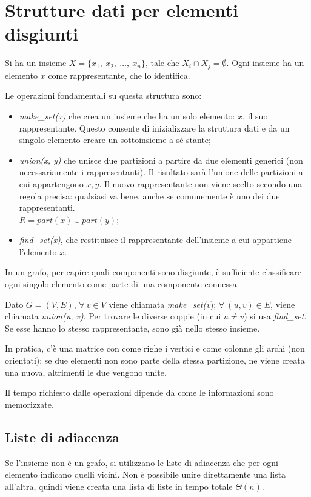 \section{Strutture dati per elementi disgiunti}
Si ha un insieme $X = \{x_1,\ x_2,\ \dots,\ x_n\}$, tale che $\bar{X}_i \cap \bar{X}_j = \emptyset$. Ogni insieme ha un elemento $x$ come rappresentante, che lo identifica.

Le operazioni fondamentali su questa struttura sono: 
\begin{itemize}
	\item \textit{make\_set(x)} che crea un insieme che ha un solo elemento: $x$, il suo rappresentante. Questo consente di inizializzare la struttura dati e da un singolo elemento creare un sottoinsieme a sé stante;
	\item \textit{union(x, y)} che unisce due partizioni a partire da due elementi generici (non necessariamente i rappresentanti). Il risultato sarà l'unione delle partizioni a cui appartengono $x, y$. Il nuovo rappresentante non viene scelto secondo una regola precisa: qualsiasi va bene, anche se comunemente è uno dei due rappresentanti. \\
	$R = part(x) \cup part(y)$;
	\item \textit{find\_set(x)}, che restituisce il rappresentante dell'insieme a cui appartiene l'elemento $x$.
\end{itemize}

In un grafo, per capire quali componenti sono disgiunte, è sufficiente classificare ogni singolo elemento come parte di una componente connessa.

Dato $G = (V, E)$, $\forall\ v \in V$ viene chiamata \textit{make\_set(v}); $\forall\ (u, v) \in E$, viene chiamata \textit{union(u, v)}. Per trovare le diverse coppie (in cui $u \neq v$) si usa \textit{find\_set}. Se esse hanno lo stesso rappresentante, sono già nello stesso insieme.

In pratica, c'è una matrice con come righe i vertici e come colonne gli archi (non orientati): se due elementi non sono parte della stessa partizione, ne viene creata una nuova, altrimenti le due vengono unite. 

Il tempo richiesto dalle operazioni dipende da come le informazioni sono memorizzate. 

\subsection{Liste di adiacenza}
Se l'insieme non è un grafo, si utilizzano le liste di adiacenza che per ogni elemento indicano quelli vicini. Non è possibile unire direttamente una lista all'altra, quindi viene creata una lista di liste in tempo totale $\Theta(n)$.

